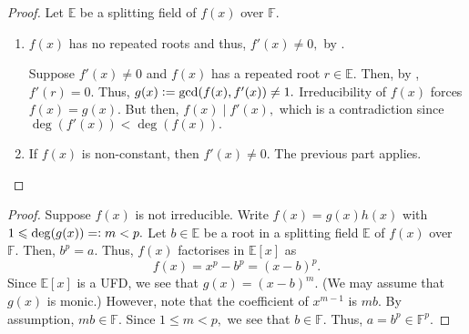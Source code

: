 \irredsepderiv*\label{prop:irredsepderiv2}
\begin{flushright}\hyperref[prop:irredsepderiv]{\upsym}\end{flushright}
\begin{proof}
    Let $\mathbb{E}$ be a splitting field of $f(x)$ over $\mathbb{F}.$
    \begin{enumerate}[leftmargin=*]
        \item \forward $f(x)$ has no repeated roots and thus, $f'(x) \neq 0,$ by .

        \backward Suppose $f'(x) \neq 0$ and $f(x)$ has a repeated root $r \in \mathbb{E}.$ Then, by , $f'(r) = 0.$ Thus, $g(x) \vcentcolon= \gcd(f(x), f'(x)) \neq 1.$ Irreducibility of $f(x)$ forces $f(x) = g(x).$ But then, $f(x) \mid f'(x),$ which is a contradiction since $\deg(f'(x)) < \deg(f(x)).$
        \item If $f(x)$ is non-constant, then $f'(x) \neq 0.$ The previous part applies. \qedhere
    \end{enumerate} 
\end{proof}

\xppolyirredorroot*\label{prop:xppolyirredorroot2}
\begin{flushright}\hyperref[prop:xppolyirredorroot]{\upsym}\end{flushright}
\begin{proof}
    Suppose $f(x)$ is not irreducible. Write $f(x) = g(x)h(x)$ with $1 \le \deg(g(x)) =\vcentcolon m < p.$ Let $b \in \mathbb{E}$ be a root in a splitting field $\mathbb{E}$ of $f(x)$ over $\mathbb{F}.$ Then, $b^p = a.$ Thus, $f(x)$ factorises in $\mathbb{E}[x]$ as
    \begin{equation*} 
        f(x) = x^p - b^p = (x - b)^p.
    \end{equation*}
    Since $\mathbb{E}[x]$ is a UFD, we see that $g(x) = (x - b)^m.$ (We may assume that $g(x)$ is monic.) However, note that the coefficient of $x^{m - 1}$ is $mb.$ By assumption, $mb \in \mathbb{F}.$ Since $1 \le m < p,$ we see that $b \in \mathbb{F}.$ Thus, $a = b^p \in \mathbb{F}^p.$     
\end{proof}

